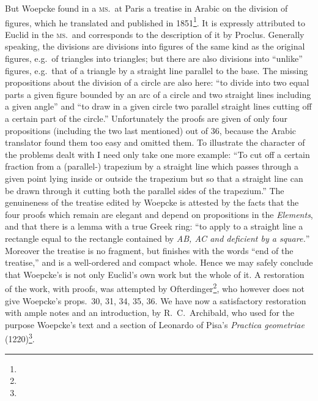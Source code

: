 But Woepcke found in a \textsc{ms.}\ at Paris a treatise in Arabic on the division of figures, which he translated and published in 1851\footnote{}. It is expressly attributed to Euclid in the \textsc{ms.}\ and corresponds to the description of it by Proclus. Generally speaking, the divisions are divisions into figures of the same kind as the original figures, e.g.~of triangles into triangles; but there are also divisions into ``unlike'' figures, e.g.~that of a triangle by a straight line parallel to the base. The missing propositions about the division of a circle are also here: ``to divide into two equal parts a given figure bounded by an arc of a circle and two straight lines including a given angle'' and ``to draw in a given circle two parallel straight lines cutting off a certain part of the circle.'' Unfortunately the proofs are given of only four propositions (including the two last mentioned) out of 36, because the Arabic translator found them too easy and omitted them. To illustrate the character of the problems dealt with I need only take one more example: ``To cut off a certain fraction from a (parallel-) trapezium by a straight line which passes through a given point lying inside or outside the trapezium but so that a straight line can be drawn through it cutting both the parallel sides of the trapezium.'' The genuineness of the treatise edited by Woepcke is attested by the facts that the four proofs which remain are elegant and depend on propositions in the \emph{Elements}, and that there is a lemma with a true Greek ring: ``to apply to a straight line a rectangle equal to the rectangle contained by \emph{AB, AC and deficient by a square.}'' Moreover the treatise is no fragment, but finishes with the words ``end of the treatise,'' and is a well-ordered and compact whole. Hence we may safely conclude that Woepcke's is not only Euclid's own work but the whole of it. A restoration of the work, with proofs, was attempted by Ofterdinger\footnote{}, who however does not give Woepcke's props.~30, 31, 34, 35, 36. We have now a satisfactory restoration with ample notes and an introduction, by R.~C.~Archibald, who used for the purpose Woepcke's text and a section of Leonardo of Pisa's \emph{Practica geometriae} (1220)\footnote{}.
